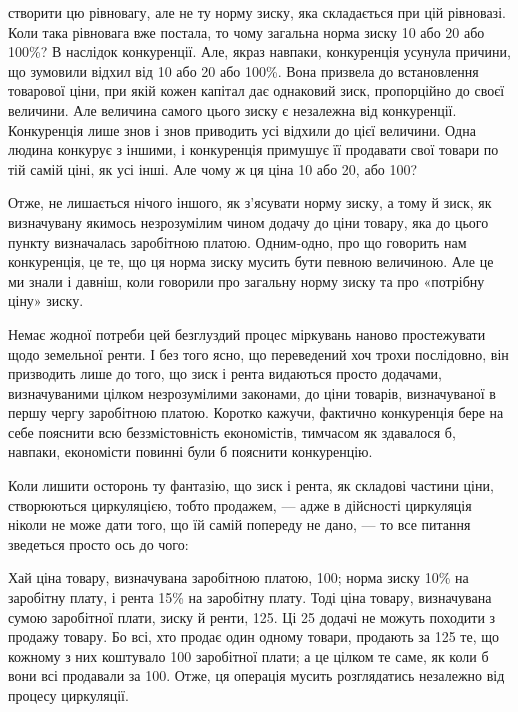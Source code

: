 \parcont{}  %
створити цю рівновагу, але не ту норму зиску, яка складається при цій рівновазі.
Коли така рівновага вже постала, то чому загальна норма зиску 10 або
20 або 100\%? В наслідок конкуренції. Але, якраз навпаки, конкуренція усунула
причини, що зумовили відхил від 10 або 20 або 100\%. Вона призвела
до встановлення товарової ціни, при якій кожен капітал дає однаковий зиск,
пропорційно до своєї величини. Але величина самого цього зиску є незалежна
від конкуренції. Конкуренція лише знов і знов приводить усі відхили до цієї
величини. Одна людина конкурує з іншими, і конкуренція примушує її продавати
свої товари по тій самій ціні, як усі інші. Але чому ж ця ціна 10 або
20, або 100?

Отже, не лишається нічого іншого, як з’ясувати норму зиску, а тому й
зиск, як визначувану якимось незрозумілим чином додачу до ціни товару, яка
до цього пункту визначалась заробітною платою. Одним-одно, про що говорить
нам конкуренція, це те, що ця норма зиску мусить бути певною величиною.
Але це ми знали і давніш, коли говорили про загальну норму зиску та про
«потрібну ціну» зиску.

Немає жодної потреби цей безглуздий процес міркувань наново простежувати
щодо земельної ренти. І без того ясно, що переведений хоч трохи послідовно,
він призводить лише до того, що зиск і рента видаються просто додачами,
визначуваними цілком незрозумілими законами, до ціни товарів, визначуваної
в першу чергу заробітною платою. Коротко кажучи, фактично конкуренція
бере на себе пояснити всю беззмістовність економістів, тимчасом як здавалося б,
навпаки, економісти повинні були б пояснити конкуренцію.

Коли лишити осторонь ту фантазію, що зиск і рента, як складові частини
ціни, створюються циркуляцією, тобто продажем, — адже в дійсності циркуляція
ніколи не може дати того, що їй самій попереду не дано, — то все питання зведеться
просто ось до чого:

Хай ціна товару, визначувана заробітною платою, \deq{} 100; норма зиску
10\% на заробітну плату, і рента 15\% на заробітну плату. Тоді ціна товару,
визначувана сумою заробітної плати, зиску й ренти, \deq{} 125. Ці 25 додачі не
можуть походити з продажу товару. Бо всі, хто продає один одному товари,
продають за 125 те, що кожному з них коштувало 100 заробітної плати; а це
цілком те саме, як коли б вони всі продавали за 100. Отже, ця операція мусить
розглядатись незалежно від процесу циркуляції.

